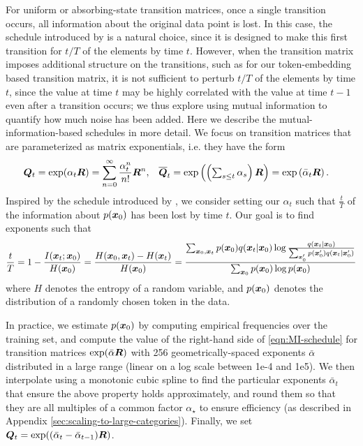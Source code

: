 For uniform or absorbing-state transition matrices, once a single transition occurs, all information about the original data point is lost. In this case, the schedule introduced by \citet{sohl2015deep} is a natural choice, since it is designed to make this first transition for $t/T$ of the elements by time $t$.
However, when the transition matrix imposes additional structure on the transitions, such as for our token-embedding based transition matrix, it is not sufficient to perturb $t/T$ of the elements by time $t$, since the value at time $t$ may be highly correlated with the value at time $t-1$ even after a transition occurs; we thus explore using mutual information to quantify how much noise has been added.
Here we describe the mutual-information-based schedules in more detail. We focus on transition matrices that are parameterized as matrix exponentials, i.e. they have the form
\begin{align*}
\boldsymbol{Q}_t &= \exp(\alpha_t \boldsymbol{R}) = \sum_{n = 0}^\infty \frac{\alpha_t^n}{n!} \boldsymbol{R}^n, &
\overline{\boldsymbol{Q}}_t &= \textstyle \exp\left(\left(\sum_{s \le t} \alpha_s\right) \boldsymbol{R}\right) = \textstyle \exp\left(\bar{\alpha}_t \boldsymbol{R}\right).
\end{align*}
Inspired by the schedule introduced by \citet{sohl2015deep}, we consider setting our $\alpha_t$ such that $\frac{t}{T}$ of the information about $p(\boldsymbol{x}_0)$ has been lost by time $t$. Our goal is to find exponents such that
\begin{equation}
\frac{t}{T}
= 1 - \frac{I(\boldsymbol{x}_t; \boldsymbol{x}_0)}{H(\boldsymbol{x}_0)}
= \frac{H(\boldsymbol{x}_0, \boldsymbol{x}_t) - H(\boldsymbol{x}_t)}{H(\boldsymbol{x}_0)}
= \frac{\sum_{\boldsymbol{x}_0, \boldsymbol{x}_t} p(\boldsymbol{x}_0)q(\boldsymbol{x}_t | \boldsymbol{x}_0) \log\frac{q(\boldsymbol{x}_t | \boldsymbol{x}_0)}{\sum_{\boldsymbol{x}_0'} p(\boldsymbol{x}_0') q(\boldsymbol{x}_t | \boldsymbol{x}_0')}}{\sum_{\boldsymbol{x}_0} p(\boldsymbol{x}_0) \log p(\boldsymbol{x}_0)}
\label{eqn:MI-schedule}
\end{equation}
where $H$ denotes the entropy of a random variable, and $p(\boldsymbol{x}_0)$ denotes the distribution of a randomly chosen token in the data.

In practice, we estimate $p(\boldsymbol{x}_0)$ by computing empirical frequencies over the training set, and compute the value of the right-hand side of \ref{eqn:MI-schedule} for transition matrices $\exp(\bar{\alpha} \boldsymbol{R})$ with 256 geometrically-spaced exponents $\bar{\alpha}$ distributed in a large range (linear on a log scale between 1e-4 and 1e5). We then interpolate using a monotonic cubic spline to find the particular exponents $\bar{\alpha}_t$ that ensure the above property holds approximately, and round them so that they are all multiples of a common factor $\alpha_\star$ to ensure efficiency (as described in Appendix \ref{sec:scaling-to-large-categories}). Finally, we set $\boldsymbol{Q}_t = \exp((\bar{\alpha}_t - \bar{\alpha}_{t-1}) \boldsymbol{R})$.

